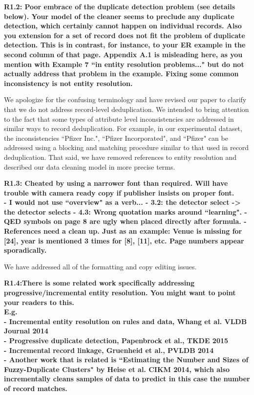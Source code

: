 \vspace{0.5em}

\noindent\textbf{R1.2: Poor embrace of the duplicate detection problem (see details below). Your model of the cleaner seems to preclude any duplicate detection, which certainly cannot happen on individual records. Also you extension for a set of record does not fit the problem of duplicate detection. This is in contrast, for instance, to your ER example in the second column of that page. Appendix A.1 is misleading here, as you mention with Example 7 ``in entity resolution problems..." but do not actually address that problem in the example. Fixing some common inconsistency is not entity resolution.}

We apologize for the confusing terminology and have revised our paper to clarify that we do not address record-level deduplication.
We intended to bring attention to the fact that some types of attribute level inconsistencies are addressed in similar ways to record deduplication.
For example, in our experimental dataset, the inconsistencies ``Pfizer Inc.", ``Pfizer Incorporated", and ``Pfizer" can be addressed using a blocking and matching procedure similar to that used in record deduplication.
That said, we have removed references to entity resolution and described our data cleaning model in more precise terms.

\vspace{0.5em}

\noindent\textbf{R1.3: Cheated by using a narrower font than required. Will have trouble with camera ready copy if publisher insists on proper font.\\
- I would not use ``overview" as a verb...
- 3.2: the detector select -> the detector selects
- 4.3: Wrong quotation marks around ``learning".
- QED symbols on page 8 are ugly when placed directly after formula. 
- References need a clean up. Just as an example: Venue is missing for [24], year is mentioned 3 times for [8], [11], etc. Page numbers appear sporadically.}

\noindent We have addressed all of the formatting and copy editing issues. 

\vspace{0.5em}

\noindent\textbf{R1.4:There is some related work specifically addressing progressive/incremental entity resolution. You might want to point your readers to this.
\\E.g.
\\- Incremental entity resolution on rules and data, Whang et al. VLDB Journal 2014
\\- Progressive duplicate detection, Papenbrock et al., TKDE 2015
\\- Incremental record linkage, Gruenheid et al., PVLDB 2014
\\- Another work that is related is ``Estimating the Number and Sizes of Fuzzy-Duplicate Clusters" by Heise et al. CIKM 2014, which also incrementally cleans samples of data to predict in this case the number of record matches.}

